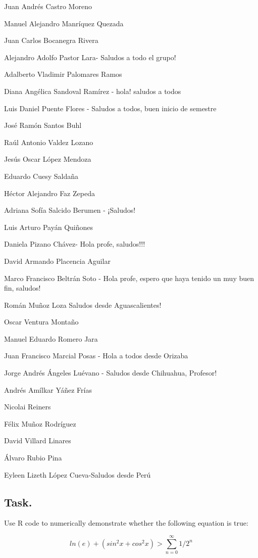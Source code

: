 \documentclass[12pt,halfline,a4paper,]{ouparticle}
\begin{document}
Juan Andrés Castro Moreno

Manuel Alejandro Manríquez Quezada

Juan Carlos Bocanegra Rivera

Alejandro Adolfo Pastor Lara- Saludos a todo el grupo!

Adalberto Vladimir Palomares Ramos

Diana Angélica Sandoval Ramírez - hola! saludos a todos

Luis Daniel Puente Flores - Saludos a todos, buen inicio de semestre

José Ramón Santos Buhl

Raúl Antonio Valdez Lozano

Jesús Oscar López Mendoza

Eduardo Cuesy Saldaña

Héctor Alejandro Faz Zepeda

Adriana Sofía Salcido Berumen - ¡Saludos!

Luis Arturo Payán Quiñones

Daniela Pizano Chávez- Hola profe, saludos!!!

David Armando Placencia Aguilar

Marco Francisco Beltrán Soto - Hola profe, espero que haya tenido un muy
buen fin, saludos!

Román Muñoz Loza Saludos desde Aguascalientes!

Oscar Ventura Montaño

Manuel Eduardo Romero Jara

Juan Francisco Marcial Posas - Hola a todos desde Orizaba

Jorge Andrés Ángeles Luévano - Saludos desde Chihuahua, Profesor!

Andrés Amílkar Yáñez Frías

Nicolai Reiners

Félix Muñoz Rodríguez

David Villard Linares

Álvaro Rubio Pina

Eyleen Lizeth López Cueva-Saludos desde Perú

\hypertarget{task.}{%
\subsection{Task.}\label{task.}}

Use R code to numerically demonstrate whether the following equation is
true:

\begin{equation}\label{eq:eq3}
ln(e)+(sin^2x+cos^2x) > \sum^{\infty}_{n=0}1/2^n
\end{equation}
\end{document}
